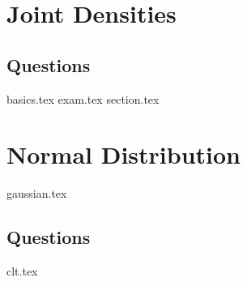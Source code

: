 \documentclass{exam}
\begin{document}
\section{Joint Densities}
\subsection{Questions}
\begin{questions}
	{basics.tex}
	{exam.tex}
	{section.tex}
\end{questions}
\section{Normal Distribution}
{gaussian.tex}
\subsection{Questions}
\begin{questions}
{clt.tex}
\end{questions}
\end{document}
